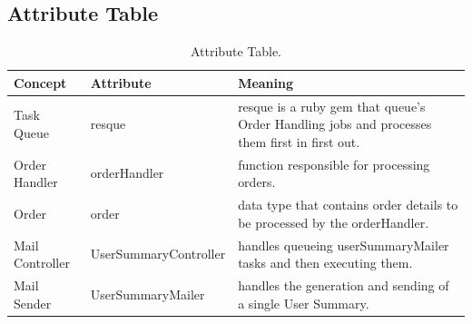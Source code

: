 \begin{table}
\subsection{Attribute Table}
\begin{tabular}{|p{1.5in}|p{1.5in}|p{3in}|}
\hline
Concept & Attribute & Meaning\\
\hline
Task Queue & resque & resque is a ruby gem that queue's Order Handling jobs and processes them first in first out.\\
\hline
Order Handler & orderHandler & function responsible for processing orders.\\
\hline
Order & order & data type that contains order details to be processed by the orderHandler.\\
\hline
Mail Controller & UserSummaryController & handles queueing userSummaryMailer tasks and then executing them.\\
\hline
Mail Sender & UserSummaryMailer & handles the generation and sending of a single User Summary.\\
\hline
\end{tabular}
\caption{ Attribute Table.}
\end{table}

